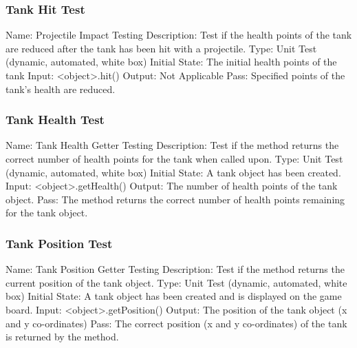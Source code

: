 \documentclass{article}
\begin{document}
\subsubsection{Tank Hit Test}
Name: Projectile Impact Testing\newline
Description: Test if the health points of the tank are reduced after the tank has been hit with a projectile.\newline
Type: Unit Test (dynamic, automated, white box)\newline
Initial State: The initial health points of the tank\newline
Input: <object>.hit()\newline
Output: Not Applicable\newline
Pass: Specified points of the tank’s health are reduced.\newline

\subsubsection{Tank Health Test}
Name: Tank Health Getter Testing\newline
Description: Test if the method returns the correct number of health points for the tank when called upon.\newline
Type: Unit Test (dynamic, automated, white box)\newline
Initial State: A tank object has been created.\newline
Input: <object>.getHealth()\newline
Output: The number of health points of the tank object.\newline
Pass: The method returns the correct number of health points remaining for the tank object.\newline

\subsubsection{Tank Position Test}
Name: Tank Position Getter Testing\newline
Description: Test if the method returns the current position of the tank object.\newline
Type: Unit Test (dynamic, automated, white box)\newline
Initial State: A tank object has been created and is displayed on the game board.\newline
Input: <object>.getPosition()\newline
Output: The position of the tank object (x and y co-ordinates)\newline
Pass: The correct position (x and y co-ordinates) of the tank is returned by the method.\newline
\end{document}
